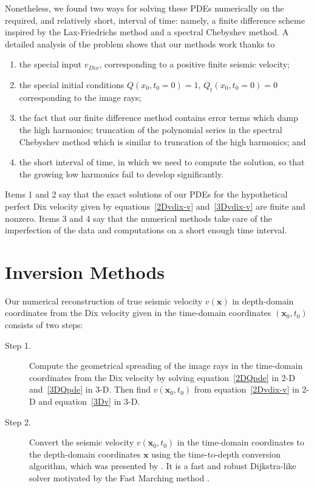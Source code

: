 Nonetheless, we found two ways 
for solving these PDEs numerically on the required,
 and relatively short, 
interval of time: namely,
a finite difference scheme inspired by the Lax-Friedrichs 
method and a spectral Chebyshev method. 
A detailed analysis of the problem shows that our methods work thanks to
\begin{enumerate}
\item{the special input $v_{Dix}$, corresponding 
to a positive finite seismic velocity;
}
\item{the special initial conditions $Q(x_0,t_0=0)=1$, $Q_t(x_0,t_0=0)=0$
 corresponding to the image rays;
}
\item{the fact that
our finite difference method contains error 
terms which damp the high harmonics;
truncation of the polynomial series in the 
spectral Chebyshev method which is similar to truncation
of the high harmonics; and
}
\item{the short interval of time, in which we need to compute the solution, 
so that the growing low harmonics fail to develop significantly.
}
\end{enumerate}
Items 1 and 2 say that the exact solutions of our PDEs for the
hypothetical perfect Dix velocity given by equations~\ref{2Dvdix-v}
and~\ref{3Dvdix-v} are finite and nonzero.  Items 3 and 4 say that the
numerical methods take care of the imperfection of the data and
computations on a short enough time interval.

\section{Inversion Methods}
Our numerical reconstruction of true seismic velocity
$v(\mathbf{x})$ in depth-domain coordinates from the Dix velocity
given in the time-domain coordinates $(\mathbf{x}_0,t_0)$ consists of
two steps:
\begin{description}
\item[Step 1.] Compute the geometrical spreading of the image rays in
  the time-domain coordinates from the Dix velocity by solving
  equation~\ref{2DQpde} in 2-D and~\ref{3DQpde} in 3-D.  Then find
  $v(\mathbf{x}_0,t_0)$ from equation~\ref{2Dvdix-v} in 2-D and
  equation~\ref{3Dv} in 3-D.
\item[Step 2.] Convert the seismic velocity $v(\mathbf{x}_0,t_0)$ in
  the time-domain coordinates to the depth-domain coordinates
  $\mathbf{x}$ using the time-to-depth conversion algorithm, which was
  presented by \cite{cfs}.  It is a fast and robust Dijkstra-like
  solver motivated by the Fast Marching method \cite[]{Sethian1996,SethFast}.
\end{description}

